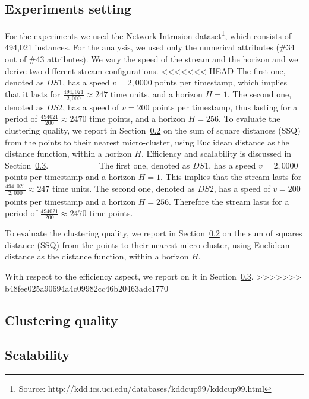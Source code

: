 \subsection{Experiments setting}
For the experiments we used the Network Intrusion dataset\footnote{Source: http://kdd.ics.uci.edu/databases/kddcup99/kddcup99.html}, which consists of 494,021 instances. For the analysis, we used only the numerical attributes (\#34 out of \#43 attributes).
We vary the speed of the stream and the horizon and we derive two different stream configurations.
<<<<<<< HEAD
The first one, denoted as $DS1$, has a speed $v=2,0000$ points per timestamp, which implies that it lasts for $\frac{494,021}{2,000} \approx 247$ time units, and a horizon $H=1$. 
The second one, denoted as $DS2$, has a speed of $v=200$ points per timestamp, thus lasting for a period of $\frac{494021}{200} \approx 2470$ time points, and a horizon $H=256$.
To evaluate the clustering quality, we report in Section~\ref{sec:expQuality} on the sum of square distances (SSQ) from the points to their nearest micro-cluster, using Euclidean distance as the distance function, within a horizon $H$. Efficiency and scalability is discussed in Section~\ref{sec:expScalability}. 
=======
The first one, denoted as $DS1$, has a speed $v=2,0000$ points per timestamp and a horizon $H=1$. This implies that the stream lasts for $\frac{494,021}{2,000} \approx 247$ time units. 
The second one, denoted as $DS2$, has a speed of $v=200$ points per timestamp and a horizon $H=256$. Therefore the stream lasts for a period of $\frac{494021}{200} \approx 2470$ time points.

To evaluate the clustering quality, we report in Section~\ref{sec:expQuality} on the sum of squares distance (SSQ) from the points to their nearest micro-cluster, using Euclidean distance as the distance function, within a horizon $H$.

With respect to the efficiency aspect, we report on it in Section~\ref{sec:expScalability}. 
>>>>>>> b48fee025a90694a4c09982cc46b20463adc1770

\subsection{Clustering quality}
\label{sec:expQuality}



\subsection{Scalability}
\label{sec:expScalability}

